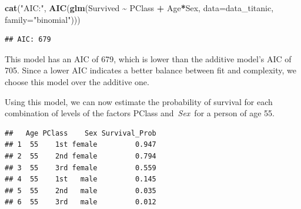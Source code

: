\documentclass[
  11pt,
]{article}
\newenvironment{Shaded}{\begin{snugshade}}{\end{snugshade}}
\newcommand{\AttributeTok}[1]{\textcolor[rgb]{0.13,0.29,0.53}{#1}}
\newcommand{\DecValTok}[1]{\textcolor[rgb]{0.00,0.00,0.81}{#1}}
\newcommand{\FunctionTok}[1]{\textcolor[rgb]{0.13,0.29,0.53}{\textbf{#1}}}
\newcommand{\NormalTok}[1]{#1}
\newcommand{\OtherTok}[1]{\textcolor[rgb]{0.56,0.35,0.01}{#1}}
\newcommand{\SpecialCharTok}[1]{\textcolor[rgb]{0.81,0.36,0.00}{\textbf{#1}}}
\newcommand{\StringTok}[1]{\textcolor[rgb]{0.31,0.60,0.02}{#1}}
\begin{document}
\begin{Shaded}
\begin{Highlighting}[]
\FunctionTok{cat}\NormalTok{(}\StringTok{"AIC:"}\NormalTok{, }\FunctionTok{AIC}\NormalTok{(}\FunctionTok{glm}\NormalTok{(Survived }\SpecialCharTok{\textasciitilde{}}\NormalTok{ PClass }\SpecialCharTok{+}\NormalTok{ Age}\SpecialCharTok{*}\NormalTok{Sex, }\AttributeTok{data=}\NormalTok{data\_titanic, }\AttributeTok{family=}\StringTok{"binomial"}\NormalTok{)))}
\end{Highlighting}
\end{Shaded}

\begin{verbatim}
## AIC: 679
\end{verbatim}

This model has an AIC of 679, which is lower than the additive model's
AIC of 705. Since a lower AIC indicates a better balance between fit and
complexity, we choose this model over the additive one.

Using this model, we can now estimate the probability of survival for
each combination of levels of the factors PClass and~\emph{Sex}~for a
person of age 55.

\begin{Shaded}
\end{Shaded}

\begin{verbatim}
##   Age PClass    Sex Survival_Prob
## 1  55    1st female         0.947
## 2  55    2nd female         0.794
## 3  55    3rd female         0.559
## 4  55    1st   male         0.145
## 5  55    2nd   male         0.035
## 6  55    3rd   male         0.012
\end{verbatim}
\end{document}
